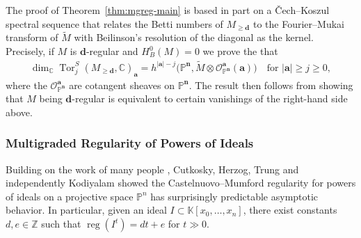 \documentclass[11pt,reqno]{amsart}
\theoremstyle{remark}
\newcommand{\reg}{\operatorname{reg}}
\newcommand{\Tor}{\operatorname{Tor}}
\renewcommand{\aa}{\mathbf a}
\newcommand{\dd}{\mathbf d}
\newcommand{\nn}{\mathbf n}
\renewcommand{\O}{\mathcal{O}}
\newcommand{\C}{\mathbb{C}}
\newcommand{\K}{\mathbb{K}}
\renewcommand{\P}{\mathbb{P}}
\newcommand{\Z}{\mathbb{Z}}
\begin{document}
The proof of Theorem~\ref{thm:mgreg-main} is based in part on a \v{C}ech--Koszul spectral sequence that relates the Betti numbers of $M_{\geq\dd}$ to the Fourier--Mukai transform of $\widetilde{M}$ with Beilinson's resolution of the diagonal as the kernel.  Precisely, if $M$ is $\dd$-regular and $H_B^0(M)=0$ we prove the that
\begin{align*}\label{eq:magic-equality}
  \dim_{\C}\Tor^S_j(M_{\geq\dd}, \C)_\aa = h^{|\aa|-j}\big(\P^{\nn}, \widetilde{M}\otimes\O_{\P^{\nn}}^\aa(\aa)\big) \quad \text{for } |\aa|\geq j\geq 0,
\end{align*}
where the $\O_{\P^{\nn}}^\aa$ are cotangent sheaves on $\P^\nn$. The result then follows from showing that $M$ being $\dd$-regular is equivalent to certain vanishings of the right-hand side above. 


%
%
%
%


\subsubsection{Multigraded Regularity of Powers of Ideals}

Building on the work of many people \cite{bertramEinLazarsfeld91,chandler97,smithSwanson97,swanson97}, Cutkosky, Herzog, Trung \cite{cutkoskyHerzogTrung99} and independently Kodiyalam \cite{kodiyalam00} showed the Castelnuovo--Mumford regularity for powers of ideals on a projective space $\P^n$ has surprisingly predictable asymptotic behavior. In particular, given an ideal $I\subset \K[x_0,\ldots,x_n]$, there exist constants $d,e\in\Z$ such that $\reg\!\left(I^t\right) = dt+e$ for $t\gg0$.
\end{document}
